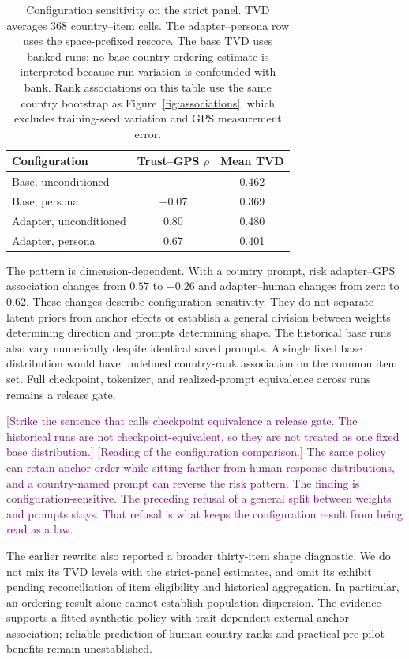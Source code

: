 \begin{table}[htbp]\centering\small
\caption{Configuration sensitivity on the strict panel. TVD averages 368 country--item cells. The adapter--persona row uses the space-prefixed rescore. The base TVD uses banked runs; no base country-ordering estimate is interpreted because run variation is confounded with bank. Rank associations on this table use the same country bootstrap as Figure~\ref{fig:associations}, which excludes training-seed variation and GPS measurement error.}\label{tab:twobytwo}
\begin{tabular}{lcc}\toprule
Configuration & Trust--GPS $\rho$ & Mean TVD\\\midrule
Base, unconditioned & --- & 0.462\\
Base, persona & $-0.07$ & 0.369\\
Adapter, unconditioned & 0.80 & 0.480\\
Adapter, persona & 0.67 & 0.401\\\bottomrule
\end{tabular}\end{table}

The pattern is dimension-dependent. With a country prompt, risk adapter--GPS association changes from $0.57$ to $-0.26$ and adapter--human changes from zero to $0.62$. These changes describe configuration sensitivity. They do not separate latent priors from anchor effects or establish a general division between weights determining direction and prompts determining shape. The historical base runs also vary numerically despite identical saved prompts. A single fixed base distribution would have undefined country-rank association on the common item set. Full checkpoint, tokenizer, and realized-prompt equivalence across runs remains a release gate.

\textcolor{purple}{[Strike the sentence that calls checkpoint equivalence a release gate. The historical runs are not checkpoint-equivalent, so they are not treated as one fixed base distribution.] [Reading of the configuration comparison.] The same policy can retain anchor order while sitting farther from human response distributions, and a country-named prompt can reverse the risk pattern. The finding is configuration-sensitive. The preceding refusal of a general split between weights and prompts stays. That refusal is what keeps the configuration result from being read as a law.}


The earlier rewrite also reported a broader thirty-item shape diagnostic. We do not mix its TVD levels with the strict-panel estimates, and omit its exhibit pending reconciliation of item eligibility and historical aggregation. In particular, an ordering result alone cannot establish population dispersion. The evidence supports a fitted synthetic policy with trait-dependent external anchor association; reliable prediction of human country ranks and practical pre-pilot benefits remain unestablished.
